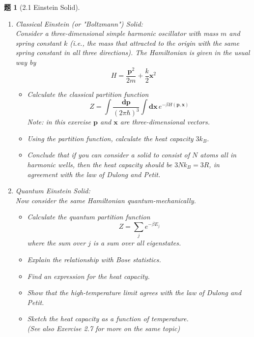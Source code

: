\documentclass[UTF8,10pt,a4paper]{article}
\theoremstyle{Problem}
\newtheorem{prob}{题}
\theoremstyle{Solution}
\begin{document}
\thispagestyle{FirstPageStyle}
\begin{prob}[2.1 Einstein Solid]
    \begin{enumerate}
        \item[(a)] \textit{Classical Einstein (or "Boltzmann") Solid:}\\
              Consider a three-dimensional simple harmonic oscillator with mass $m$ and spring constant $k$ (i.e., the mass that attracted to the origin with the same spring constant in all three directions). The Hamiltonian is given in the usual way by
              \[
                  H=\frac{\bm{p}^2}{2m}+\frac{k}{2}\bm{x}^2
              \]
              \begin{itemize}
                  \item[$\triangleright$] Calculate the classical partition function
                        \[
                            Z=\int\frac{\bm{dp}}{(2\pi\hbar)^3}\int\bm{dx}\,e^{-\beta H(\bm{p},\bm{x})}
                        \]
                        Note: in this exercise $\bm{p}$ and $\bm{x}$ are three-dimensional vectors.
                  \item[$\triangleright$] Using the partition function, calculate the heat capacity $3k_B$.
                  \item[$\triangleright$] Conclude that if you can consider a solid to consist of $N$ atoms all in harmonic wells, then the heat capacity should be $3Nk_B=3R$, in agreement with the law of Dulong and Petit.
              \end{itemize}
        \item[(b)] \textit{Quantum Einstein Solid}:\\
              Now consider the same Hamiltonian quantum-mechanically.
              \begin{itemize}
                  \item[$\triangleright$] Calculate the quantum partition function
                        \[
                            Z=\sum_je^{-\beta E_j}
                        \]
                        where the sum over $j$ is a sum over all eigenstates.
                  \item[$\triangleright$] Explain the relationship with Bose statistics.
                  \item[$\triangleright$] Find an expression for the heat capacity.
                  \item[$\triangleright$] Show that the high-temperature limit agrees with the law of Dulong and Petit.
                  \item[$\triangleright$] Sketch the heat capacity as a function of temperature.\\
                        (See also Exercise 2.7 for more on the same topic)
              \end{itemize}
    \end{enumerate}
\end{prob}
\end{document}
